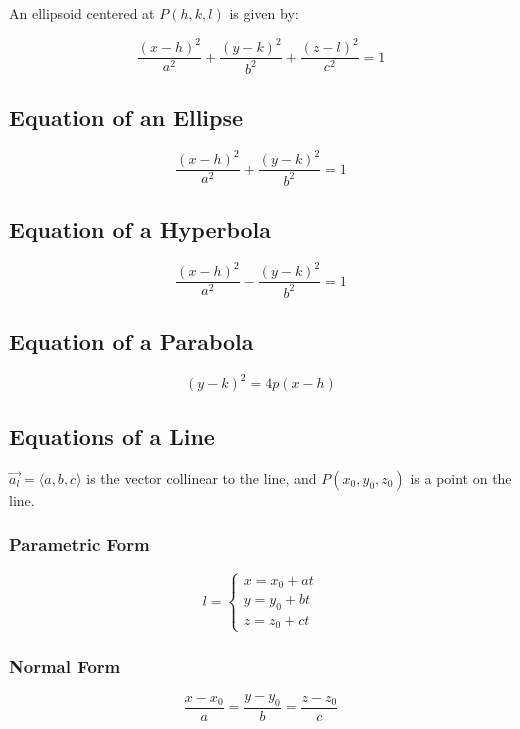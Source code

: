 An ellipsoid centered at \(P(h, k, l)\) is given by:

\begin{equation}\label{Equation of an Ellipsoid}
    \dfrac{(x-h)^2}{a^2} +  
    \dfrac{(y-k)^2}{b^2} + 
    \dfrac{(z-l)^2}{c^2} = 1
\end{equation}

\subsection{Equation of an Ellipse}
\begin{equation}\label{Equation of an Ellipse}
    \dfrac{(x-h)^2}{a^2} + \dfrac{(y-k)^2}{b^2} = 1
\end{equation}

\subsection{Equation of a Hyperbola}
\begin{equation}\label{Equation of a Hyperbola}
    \dfrac{(x-h)^2}{a^2} - \dfrac{(y-k)^2}{b^2} = 1
\end{equation}
\subsection{Equation of a Parabola}
\begin{equation}\label{Equation of a Parabola}
    (y-k)^2 = 4p(x-h)
\end{equation}

\subsection{Equations of a Line}
\(\vec{a_l} = \langle a, b, c \rangle\) is the vector collinear to the line, and \(P(x_0, y_0, z_0)\) is a point on the line.
\subsubsection{Parametric Form}
\begin{equation}\label{Parametric Form of a Line}
    l = 
    \begin{cases}
        x = x_0 + at\\
        y = y_0 + bt\\
        z = z_0 + ct
    \end{cases}
\end{equation}

\subsubsection{Normal Form}
\begin{equation}\label{Normal Form of a Line}
    \dfrac{x-x_0}{a} = \dfrac{y-y_0}{b} = \dfrac{z-z_0}{c}
\end{equation}

